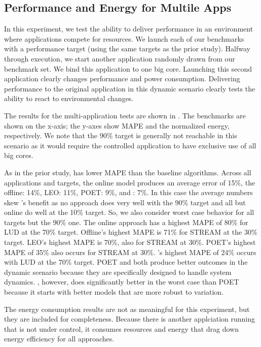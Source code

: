 \subsection{Performance and Energy for Multile Apps}
In this experiment, we test the ability to deliver performance in an
environment where applications compete for resources.  We launch each
of our benchmarks with a performance target (using the same targets as
the prior study).  Halfway through execution, we start another
application randomly drawn from our benchmark set.  We bind this
application to one big core.  Launching this second application
clearly changes performance and power consumption.  Delivering
performance to the original application in this dynamic scenario
clearly tests the ability to react to environmental changes.

The results for the multi-application tests are shown in
.  The benchmarks are shown on the
x-axis; the y-axes show MAPE and the normalized energy, respectively.
We note that the 90\% target is generally not reachable in this
scenario as it would require the controlled application to have
exclusive use of all big cores.


As in the prior study, \SYSTEM{} has lower MAPE than the baseline
algorithms. Across all applications and targets, the online model
produces an average error of 15\%, the offline: 14\%, LEO: 11\%, POET:
9\%, and \SYSTEM{}: 7\%.  In this case the average numbers skew
\SYSTEM{}'s benefit as no approach does very well with the 90\% target
and all but online do well at the 10\% target.  So, we also consider
worst case behavior for all targets but the 90\% one.  The online
approach has a highest MAPE of 80\% for LUD at the 70\% target.
Offline's highest MAPE is 71\% for STREAM at the 30\% target.  LEO's
highest MAPE is 70\%, also for STREAM at 30\%. POET's highest MAPE of
35\% also occurs for STREAM at 30\%.  \SYSTEM{}'s highest MAPE of 24\%
occurs with LUD at the 70\% target.  POET and \SYSTEM{} both produce
better outcomes in the dynamic scenario because they are specifically
designed to handle system dynamics.  \SYSTEM{}, however, does
significantly better in the worst case than POET because it starts
with better models that are more robust to variation.

The energy consumption results are not as meaningful for this
experiment, but they are included for completeness.  Because there is
another applciation running that is not under control, it consumes
resources and energy that drag down energy efficiency for all
approaches. 

